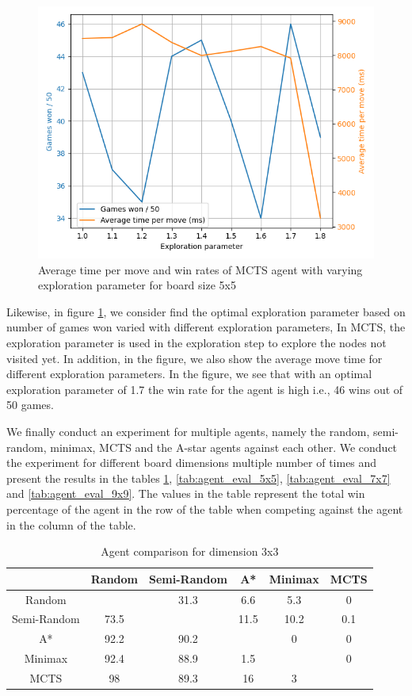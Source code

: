 \begin{figure}[!ht]
    \centering
    \includegraphics[width=0.7\linewidth]{../img/mcts_exploration_param_grid_search.png}
    \caption{Average time per move and win rates of MCTS agent with varying exploration parameter for board size 5x5}
    \label{fig:mcts_exp_simulations}
\end{figure}

Likewise, in figure \ref{fig:mcts_exp_simulations}, we consider find the optimal exploration parameter based on number of games won varied with different exploration parameters, In \gls{MCTS}, the exploration parameter is used in the exploration step to explore the nodes not visited yet. In addition, in the figure, we also show the average move time for different exploration parameters. In the figure, we see that with an optimal exploration parameter of 1.7 the win rate for the agent is high i.e., 46 wins out of 50 games.

We finally conduct an experiment for multiple agents, namely the random, semi-random, minimax, MCTS and the A-star agents against each other. We conduct the experiment for different board dimensions multiple number of times and present the results in the tables \ref{tab:agent_eval_3x3}, \ref{tab:agent_eval_5x5}, \ref{tab:agent_eval_7x7} and \ref{tab:agent_eval_9x9}. The values in the table represent the total win percentage of the agent in the row of the table when competing against the agent in the column of the table.

\begin{table}[!ht]
    \centering
     \begin{tabular}{|c|c|c|c|c|c|}\hline
                & Random & Semi-Random & A*  & Minimax & MCTS \\ \hline 
    Random      &        &    31.3     & 6.6 &   5.3   &  0   \\ \hline
    Semi-Random &   73.5 &             & 11.5&   10.2  & 0.1  \\ \hline
    A*          &   92.2 &    90.2     &     &   0     &  0   \\ \hline
    Minimax     &   92.4 &    88.9     & 1.5 &         &  0   \\ \hline
    MCTS        &   98   &    89.3     &  16 &   3     &      \\ \hline
     \end{tabular}
     \caption{Agent comparison for dimension 3x3}
     \label{tab:agent_eval_3x3}
 \end{table}

